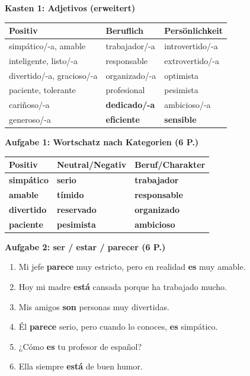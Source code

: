 \documentclass[11pt,a4paper]{article}
\newcommand{\lsg}[1]{\textcolor{loesung}{\textbf{#1}}}
\begin{document}
\begin{gruppeBbox}

\textbf{Kasten 1: Adjetivos (erweitert)}

\begin{tabularx}{\textwidth}{@{}|X|X|X|@{}}
\hline
\textbf{Positiv} & \textbf{Beruflich} & \textbf{Persönlichkeit} \\
\hline
simpático/-a, amable & trabajador/-a & introvertido/-a \\
inteligente, listo/-a & responsable & extrovertido/-a \\
divertido/-a, gracioso/-a & organizado/-a & optimista \\
paciente, tolerante & profesional & pesimista \\
cariñoso/-a & \lsg{dedicado/-a} & ambicioso/-a \\
generoso/-a & \lsg{eficiente} & \lsg{sensible} \\
\hline
\end{tabularx}

\vspace{0.8em}

\textbf{Aufgabe 1: Wortschatz nach Kategorien (6 P.)}

\begin{tabularx}{\textwidth}{@{}|X|X|X|@{}}
\hline
\textbf{Positiv} & \textbf{Neutral/Negativ} & \textbf{Beruf/Charakter} \\
\hline
\lsg{simpático} & \lsg{serio} & \lsg{trabajador} \\
\lsg{amable} & \lsg{tímido} & \lsg{responsable} \\
\lsg{divertido} & \lsg{reservado} & \lsg{organizado} \\
\lsg{paciente} & \lsg{pesimista} & \lsg{ambicioso} \\
\hline
\end{tabularx}

\vspace{0.5em}

\textbf{Aufgabe 2: ser / estar / parecer (6 P.)}
\begin{enumerate}[label=\alph*), leftmargin=2em, nosep]
    \item Mi jefe \lsg{parece} muy estricto, pero en realidad \lsg{es} muy amable.
    \item Hoy mi madre \lsg{está} cansada porque ha trabajado mucho.
    \item Mis amigos \lsg{son} personas muy divertidas.
    \item Él \lsg{parece} serio, pero cuando lo conoces, \lsg{es} simpático.
    \item ¿Cómo \lsg{es} tu profesor de español?
    \item Ella siempre \lsg{está} de buen humor.
\end{enumerate}


\end{gruppeBbox}
\end{document}
